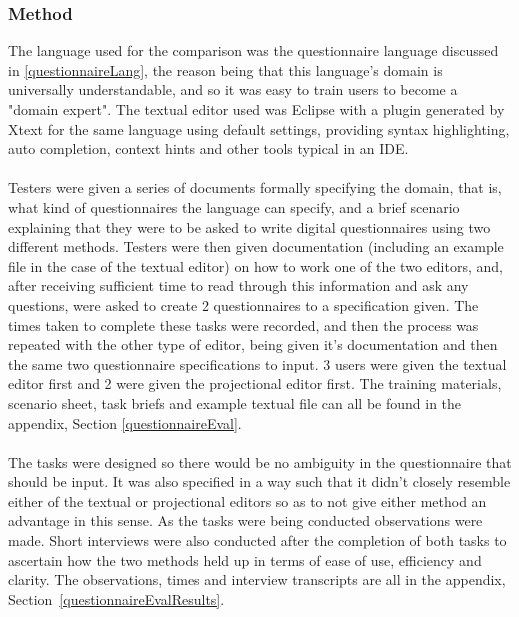 \documentclass{article}
\begin{document}
\subsubsection{Method}
The language used for the comparison was the questionnaire language discussed in \ref{questionnaireLang}, the reason being that this language's domain is universally understandable, and so it was easy to train users to become a "domain expert". The textual editor used was Eclipse with a plugin generated by Xtext for the same language using default settings, providing syntax highlighting, auto completion, context hints and other tools typical in an IDE.
\\
\\
Testers were given a series of documents formally specifying the domain, that is, what kind of  questionnaires the language can specify, and a brief scenario explaining that they were to be asked to write digital questionnaires using two different methods. Testers were then given documentation (including an example file in the case of the textual editor) on how to work one of the two editors, and, after receiving sufficient time to read through this information and ask any questions, were asked to create 2 questionnaires to a specification given. The times taken to complete these tasks were recorded, and then the process was repeated with the other type of editor, being given it's documentation and then the same two questionnaire specifications to input. 3 users were given the textual editor first and 2 were given the projectional editor first. The training materials, scenario sheet, task briefs and example textual file can all be found in the appendix, Section \ref{questionnaireEval}.
\\
\\
The tasks were designed so there would be no ambiguity in the questionnaire that should be input. It was also specified in a way such that it didn't closely resemble either of the textual or projectional editors so as to not give either method an advantage in this sense. As the tasks were being conducted observations were made. Short interviews were also conducted after the completion of both tasks to ascertain how the two methods held up in terms of ease of use, efficiency and clarity. The observations, times and interview transcripts are all in the appendix, Section~\ref{questionnaireEvalResults}.
\end{document}

